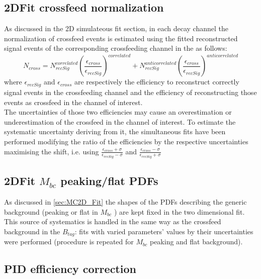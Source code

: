 \subsection{2DFit crossfeed normalization}
As discussed in the 2D simulateous fit section, in each decay channel the normalization of crossfeed events 
is estimated using the fitted reconstructed signal events of the corresponding crossfeeding channel in the as follows:
\begin{equation}
N_{cross } = N_{recSig}^{correlated} (\dfrac{\epsilon_{cross}}{\epsilon_{recSig}})^{correlated} + 
N_{recSig}^{anticorrelated} (\frac{\epsilon_{cross}}{\epsilon_{recSig}})^{anticorrelated}
\end{equation}
where  $\epsilon_{recSig}$  and $\epsilon_{cross}$ are respectively the efficiency to reconstruct correctly
 signal events in the crossfeeding channel and the efficiency of reconstructing those events as crossfeed in the
 channel of interest.\\
 The uncertainties of those two efficiencies may cause an overestimation or underestimation of the crossfeed 
 in the channel of interest. To estimate the systematic uncertainty deriving from it, the simultaneous fits 
 have been performed modifying the ratio of the efficiencies by the respective uncertainties maximising the shift, 
 i.e. using $\frac{\epsilon_{cross} + \sigma}{\epsilon_{recSig} - \sigma}$ and $\frac{\epsilon_{cross} - \sigma}{\epsilon_{recSig} + \sigma}$ 

 \subsection{2DFit $M_{bc}$ peaking/flat PDFs}
As discussed in \cref{sec:MC2D_Fit} the shapes of the PDFs describing the generic background (peaking or flat in $M_{bc}$ ) are kept fixed
 in the two dimensional fit. This source of systematics is handled in the same way as the crossfeed background in the $B_{tag}$:
 fits with varied parameters' values by their uncertainties were performed (procedure is repeated for $M_{bc}$ peaking and flat background).

 \subsection{PID  efficiency correction}\label{sec:chargedCorrPIDcorrSys}


